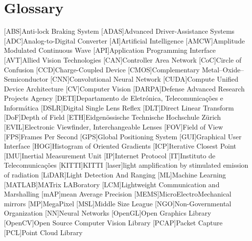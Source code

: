 \chapter{Glossary}

\footnotesize
\SingleSpacing

\begin{multicols}{2} 
\begin{acronym}[AAAAAA]
	[ABS]{Anti-lock Braking System}
	[ADAS]{Advanced Driver-Assistance Systems}
	[ADC]{Analog-to-Digital Converter}
	[AI]{Artificial Intelligence}
	[AMCW]{Amplitude Modulated Continuous Wave}
	[API]{Application Programming Interface}
	[AVT]{Allied Vision Technologies}
	[CAN]{Controller Area Network} 
	[CoC]{Circle of Confusion}
	[CCD]{Charge-Coupled Device}
	[CMOS]{Complementary Metal–Oxide–Semiconductor}
	[CNN]{Convolutional Neural Network}
	[CUDA]{Compute Unified Device Architecture}
	[CV]{Computer Vision}
	[DARPA]{Defense Advanced Research Projects Agency}
	[DETI]{Departamento de Eletrónica, Telecomunicações e Informática}
	[DSLR]{Digital Single Lens Reflex}
	[DLT]{Direct Linear Transform}
	[DoF]{Depth of Field}
	[ETH]{Eidgenössische Technische Hochschule Zürich}
	[EVIL]{Electronic Viewfinder, Interchangeable Lenses}
	[FOV]{Field of View}
	[FPS]{Frames Per Second}
	[GPS]{Global Positioning System}
	[GUI]{Graphical User Interface}
	[HOG]{Histogram of Oriented Gradients}
	[ICP]{Iterative Closest Point}
	[IMU]{Inertial Measurement Unit}
	[IP]{Internet Protocol}
	[IT]{Instituto de Telecomunicações}
	[KITTI]{KITTI}
	[laser]{light amplification by stimulated emission of radiation}
	[LiDAR]{Light Detection And Ranging}
	[ML]{Machine Learning}
	[MATLAB\textsuperscript{\tiny\textregistered}]{MATrix LABoratory\textsuperscript{\tiny\textregistered}}
	[LCM]{Lightweight Communication and Marshalling}
	[mAP]{mean Average Precision}
	[MEMS]{MicroElectroMechanical mirrors}
	[MP]{MegaPixel}
	[MSL]{Middle Size League}
	[NGO]{Non-Governmental Organization} 
	[NN]{Neural Networks}
	[OpenGL]{Open Graphics Library}
	[OpenCV]{Open Source Computer Vision Library}
	[PCAP]{Packet Capture}
	[PCL]{Point Cloud Library}

\end{acronym}
\end{multicols}
